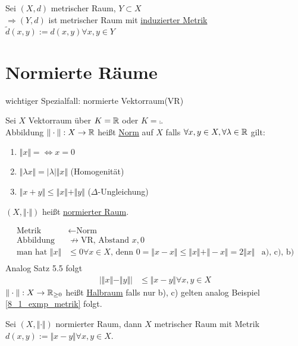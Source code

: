 \begin{exmpn}
	Sei $(X,d)$ metrischer Raum, $Y \subset X$\\
    $\Rightarrow (Y,d)$ ist metrischer Raum mit \underline{induzierter Metrik} $\tilde{d}(x,y):=d(x,y)\forall x,y \in Y$
\end{exmpn}

\section{Normierte Räume}

wichtiger Spezialfall: normierte Vektorraum(VR)

\begin{mydefn}[Norm]
    Sei $X$ Vektorraum über $K=\mathbb{R}$ oder $K=\comp$.\\
    Abbildung $\Vert \cdot \Vert: X \to \mathbb{R}$ heißt \underline{Norm} auf $X$ falls $\forall x,y \in X, \forall \lambda \in \mathbb{R}$ gilt:
    \begin{enumerate}[label={\alph*)}]
    \item $\Vert x\Vert = \Leftrightarrow x=0$
    \item $\Vert \lambda x\Vert = \vert \lambda \vert \Vert x\Vert$ (Homogenität)
    \item $\Vert x+y\Vert \leq \Vert x\Vert + \Vert y\Vert$ ($\Delta$-Ungleichung)
    \end{enumerate}
    $(X,\Vert \cdot\Vert)$ heißt \underline{normierter Raum}.
\end{mydefn}

\begin{align*}
    \text{Metrik} &\leftarrow \text{Norm}&\\
    \text{Abbildung} & \not \rightarrow \text{VR, Abstand } x,0\\
    \text{man hat } \Vert x \Vert &\leq 0 \forall x \in X \text{, denn } 0 = \Vert x-x\Vert \leq \Vert x\Vert + \Vert -x\Vert = 2\Vert x\Vert & \text{a), c), b)}\\   
\end{align*}
Analog Satz 5.5 folgt\\
\begin{align}
    \vert \Vert x \Vert - \Vert y \Vert\vert &\leq \Vert x-y\Vert \forall x,y \in X
\end{align}
$\Vert \cdot\Vert: X \to \mathbb{R}_{\geq0}$ heißt \underline{Halbraum} falls nur b), c) gelten analog Beispiel \ref{8_1_exmp_metrik} folgt.

\begin{satz}
    Sei $(X,\Vert\cdot \Vert)$ normierter Raum, dann $X$ metrischer Raum mit Metrik $d(x,y):=\Vert x-y \Vert\forall x,y \in X$.
\end{satz}

